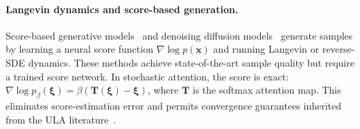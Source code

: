 \paragraph{Langevin dynamics and score-based generation.}
Score-based generative models~\cite{songGenerativeModelingEstimating2019,songScoreBasedGenerativeModeling2021} and denoising diffusion models~\cite{hoDenoisingDiffusionProbabilistic2020} generate samples by learning a neural score function $\nabla \log p(\mathbf{x})$ and running Langevin or reverse-SDE dynamics. These methods achieve state-of-the-art sample quality but require a trained score network. In stochastic attention, the score is exact: $\nabla \log p_\beta(\boldsymbol{\xi}) = \beta(\mathbf{T}(\boldsymbol{\xi}) - \boldsymbol{\xi})$, where $\mathbf{T}$ is the softmax attention map. This eliminates score-estimation error and permits convergence guarantees inherited from the ULA literature~\cite{durmusNonasymptoticAnalysisUnadjusted2017,dalalyanTheoreticalGuaranteesApproximate2017}.
